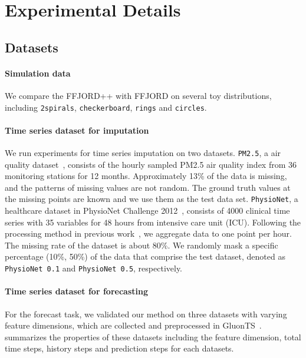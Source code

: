 \section{Experimental Details}
\subsection{Datasets}

\paragraph{Simulation data}
We compare the FFJORD++ with FFJORD on several toy distributions, including \texttt{2spirals}, \texttt{checkerboard}, \texttt{rings} and \texttt{circles}.

\paragraph{Time series dataset for imputation }
We run experiments for time series imputation on two datasets. 
\texttt{PM2.5}, a air quality dataset~\citep{yi2016pm25}, consists of the hourly sampled PM2.5 air quality index from 36 monitoring stations for 12 months. Approximately 13\% of the data is missing, and the patterns of missing values are not random. The ground truth values at the missing points are known and we use them as the test data set.
\texttt{PhysioNet}, a healthcare dataset in PhysioNet Challenge 2012~\citep{silva2012physio}, consists of 4000 clinical time series with 35 variables for 48 hours from intensive care unit (ICU). Following the processing method in previous work~\citep{provably_schrodinger_bridge, CSDI, cao2018data_precoss1, che2018data_precoss2}, we aggregate data to one point per hour. The missing rate of the dataset is about 80\%. We randomly mask a specific percentage (10\%, 50\%) of the data that comprise the test dataset, denoted as \texttt{PhysioNet 0.1} and \texttt{PhysioNet 0.5}, respectively.

\paragraph{Time series dataset for forecasting}
For the forecast task, we validated our method on three datasets with varying feature dimensions, which are collected and preprocessed in GluonTS~\citet{alexandrov2020gluonts}.
 summarizes the properties of these datasets including the feature dimension, total time steps, history steps and prediction steps for each datasets.



